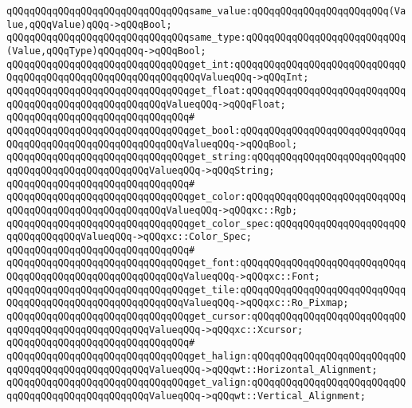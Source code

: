 \newline
\verb|qQQqqQQqqQQqqQQqqQQqqQQqqQQqqQQqsame_value:qQQqqQQqqQQqqQQqqQQqqQQq(Value,qQQqValue)qQQq->qQQqBool;|\newline
\verb|qQQqqQQqqQQqqQQqqQQqqQQqqQQqqQQqsame_type:qQQqqQQqqQQqqQQqqQQqqQQqqQQq(Value,qQQqType)qQQqqQQq->qQQqBool;|\newline
\newline
\verb|qQQqqQQqqQQqqQQqqQQqqQQqqQQqqQQqget_int:qQQqqQQqqQQqqQQqqQQqqQQqqQQqqQQqqQQqqQQqqQQqqQQqqQQqqQQqqQQqqQQqValueqQQq->qQQqInt;|\newline
\verb|qQQqqQQqqQQqqQQqqQQqqQQqqQQqqQQqget_float:qQQqqQQqqQQqqQQqqQQqqQQqqQQqqQQqqQQqqQQqqQQqqQQqqQQqqQQqValueqQQq->qQQqFloat;|\newline
\verb|qQQqqQQqqQQqqQQqqQQqqQQqqQQqqQQq#|\newline
\verb|qQQqqQQqqQQqqQQqqQQqqQQqqQQqqQQqget_bool:qQQqqQQqqQQqqQQqqQQqqQQqqQQqqQQqqQQqqQQqqQQqqQQqqQQqqQQqqQQqValueqQQq->qQQqBool;|\newline
\verb|qQQqqQQqqQQqqQQqqQQqqQQqqQQqqQQqget_string:qQQqqQQqqQQqqQQqqQQqqQQqqQQqqQQqqQQqqQQqqQQqqQQqqQQqValueqQQq->qQQqString;|\newline
\verb|qQQqqQQqqQQqqQQqqQQqqQQqqQQqqQQq#|\newline
\verb|qQQqqQQqqQQqqQQqqQQqqQQqqQQqqQQqget_color:qQQqqQQqqQQqqQQqqQQqqQQqqQQqqQQqqQQqqQQqqQQqqQQqqQQqqQQqValueqQQq->qQQqxc::Rgb;|\newline
\verb|qQQqqQQqqQQqqQQqqQQqqQQqqQQqqQQqget_color_spec:qQQqqQQqqQQqqQQqqQQqqQQqqQQqqQQqqQQqValueqQQq->qQQqxc::Color_Spec;|\newline
\verb|qQQqqQQqqQQqqQQqqQQqqQQqqQQqqQQq#|\newline
\verb|qQQqqQQqqQQqqQQqqQQqqQQqqQQqqQQqget_font:qQQqqQQqqQQqqQQqqQQqqQQqqQQqqQQqqQQqqQQqqQQqqQQqqQQqqQQqqQQqValueqQQq->qQQqxc::Font;|\newline
\verb|qQQqqQQqqQQqqQQqqQQqqQQqqQQqqQQqget_tile:qQQqqQQqqQQqqQQqqQQqqQQqqQQqqQQqqQQqqQQqqQQqqQQqqQQqqQQqqQQqValueqQQq->qQQqxc::Ro_Pixmap;|\newline
\verb|qQQqqQQqqQQqqQQqqQQqqQQqqQQqqQQqget_cursor:qQQqqQQqqQQqqQQqqQQqqQQqqQQqqQQqqQQqqQQqqQQqqQQqqQQqValueqQQq->qQQqxc::Xcursor;|\newline
\verb|qQQqqQQqqQQqqQQqqQQqqQQqqQQqqQQq#|\newline
\verb|qQQqqQQqqQQqqQQqqQQqqQQqqQQqqQQqget_halign:qQQqqQQqqQQqqQQqqQQqqQQqqQQqqQQqqQQqqQQqqQQqqQQqqQQqValueqQQq->qQQqwt::Horizontal_Alignment;|\newline
\verb|qQQqqQQqqQQqqQQqqQQqqQQqqQQqqQQqget_valign:qQQqqQQqqQQqqQQqqQQqqQQqqQQqqQQqqQQqqQQqqQQqqQQqqQQqValueqQQq->qQQqwt::Vertical_Alignment;|\newline
